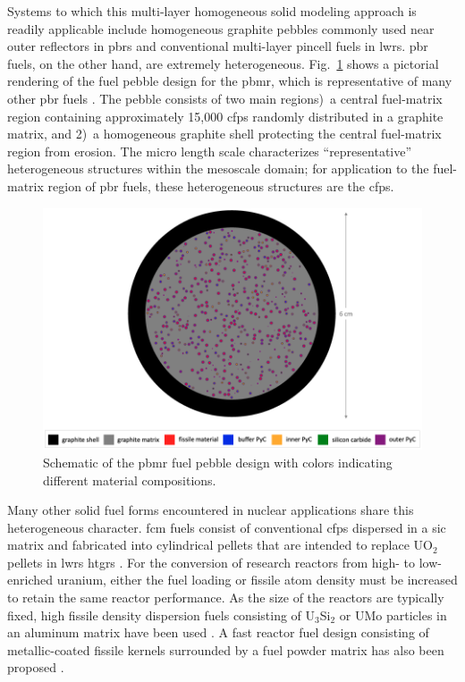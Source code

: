 Systems to which this multi-layer homogeneous solid modeling approach is readily applicable include homogeneous graphite pebbles commonly used near outer reflectors in \glspl{pbr} and conventional multi-layer pincell fuels in \glspl{lwr}. \gls{pbr} fuels, on the other hand, are extremely heterogeneous. Fig.\ \ref{fig:pbmr_pebble} shows a pictorial rendering of the fuel pebble design for the \gls{pbmr}, which is representative of many other \gls{pbr} fuels \cite{tecdoc1694}. The pebble consists of two main regions)~a central fuel-matrix region containing approximately 15,000 \glspl{cfp} randomly distributed in a graphite matrix, and 2)~a homogeneous graphite shell protecting the central fuel-matrix region from erosion. The micro length scale characterizes ``representative'' heterogeneous structures within the mesoscale domain; for application to the fuel-matrix region of \gls{pbr} fuels, these heterogeneous structures are the \glspl{cfp}.

\begin{figure}[!h]
\centering
  \includegraphics[width=0.85\linewidth]{figs/pbmr_pebble.png}
\caption{Schematic of the \gls{pbmr} fuel pebble design with colors indicating different material compositions.}
\label{fig:pbmr_pebble}
\end{figure}

Many other solid fuel forms encountered in nuclear applications share this heterogeneous character. \gls{fcm} fuels consist of conventional \glspl{cfp} dispersed in a \gls{sic} matrix and fabricated into cylindrical pellets that are intended to replace UO$_2$ pellets in \glspl{lwr} \glspl{htgr} \cite{lu,snead_fcm}. For the conversion of research reactors from high- to low-enriched uranium, either the fuel loading or fissile atom density must be increased to retain the same reactor performance. As the size of the reactors are typically fixed, high fissile density dispersion fuels consisting of U$_3$Si$_2$ or UMo particles in an aluminum matrix have been used \cite{mistarihi,jeong2015}. A fast reactor fuel design consisting of metallic-coated fissile kernels surrounded by a fuel powder matrix has also been proposed \cite{abdalla}.

